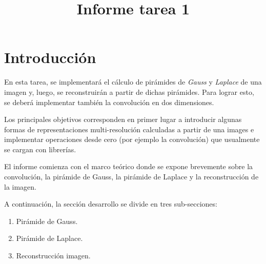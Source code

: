 \documentclass[12pt, letterpaper]{article}
\title{Informe tarea 1} %
\begin{document}


\setcounter{page}{1}
\tableofcontents 
\newpage
\listoffigures
\listoftables
\lstlistoflistings


\newpage
{}
\setcounter{page}{1}

\newpage
\section{Introducción}

\par En esta tarea, se implementará el cálculo de pirámides de \textit{Gauss} y \textit{Laplace} de una imagen y, luego, se reconstruirán a partir de dichas pirámides. Para lograr esto, se deberá implementar también la convolución en dos dimensiones. 
\par Los principales objetivos corresponden en primer lugar a introducir algunas formas de representaciones multi-resolución calculadas a partir de una images e implementar operaciones desde cero (por ejemplo la convolución) que usualmente se cargan con librerías. 

\bigskip

\par El informe comienza con el marco teórico donde se expone brevemente sobre la convolución, la pirámide de Gauss, la pirámide de Laplace y la reconstrucción de la imagen. 

\par A continuación, la sección desarrollo se divide en tres sub-secciones:
\begin{enumerate}
  \item Pirámide de Gauss.
  \item Pirámide de Laplace.
  \item Reconstrucción imagen. 
\end{enumerate}
\end{document}
